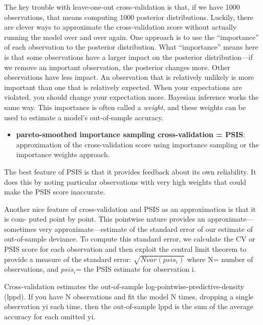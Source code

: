 \documentclass[
]{article}
\providecommand{\tightlist}{%
  \setlength{\itemsep}{0pt}\setlength{\parskip}{0pt}}
\begin{document}
The key trouble with leave-one-out cross-validation is that, if we have
1000 observations, that means computing 1000 posterior distributions.
Luckily, there are clever ways to approximate the cross-validation score
without actually running the model over and over again. One approach is
to use the ``importance'' of each observation to the posterior
distribution. What ``importance'' means here is that some observations
have a larger impact on the posterior distribution---if we remove an
important observation, the posterior changes more. Other observations
have less impact. An observation that is relatively unlikely is more
important than one that is relatively expected. When your expectations
are violated, you should change your expectation more. Bayesian
inference works the same way. This importance is often called a
\emph{weight}, and these weights can be used to estimate a model's
out-of-sample accuracy.

\begin{itemize}
\tightlist
\item
  \textbf{pareto-smoothed importance sampling cross-validation = PSIS}:
  approximation of the cross-validation score using importance sampling
  or the importance weights approach.
\end{itemize}

The best feature of PSIS is that it provides feedback about its own
reliability. It does this by noting particular observations with very
high weights that could make the PSIS score inaccurate.

Another nice feature of cross-validation and PSIS as an approximation is
that it is com- puted point by point. This pointwise nature provides an
approximate---sometimes very approximate---estimate of the standard
error of our estimate of out-of-sample deviance. To compute this
standard error, we calculate the CV or PSIS score for each observation
and then exploit the central limit theorem to provide a measure of the
standard error: \(\sqrt{Nvar(psis_i)}\) where N= number of observations,
and \(psis_i\)= the PSIS estimate for observation i.

Cross-validation estimates the out-of-sample
log-pointwise-predictive-density (lppd). If you have N observations and
fit the model N times, dropping a single observation yi each time, then
the out-of-sample lppd is the sum of the average accuracy for each
omitted yi.
\end{document}
